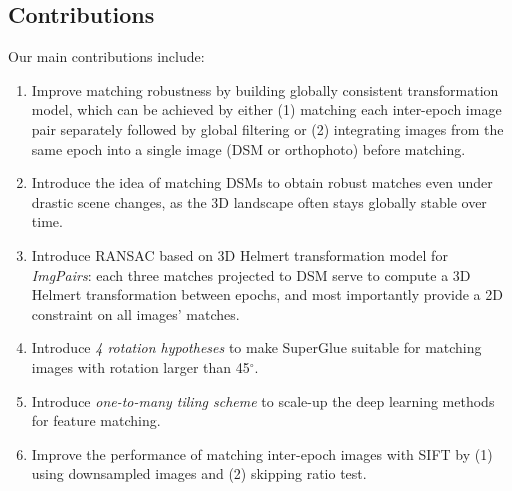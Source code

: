 
\subsection{Contributions}
Our main contributions include:\\
\begin{enumerate}
	\item Improve matching robustness by building globally consistent transformation model, which can be achieved by either (1) matching each inter-epoch image pair separately followed by global filtering or (2) integrating images from the same epoch into a single image (DSM or orthophoto) before matching.
	\item Introduce the idea of matching DSMs to obtain robust matches even under drastic scene changes, as the 3D landscape often stays globally stable over time.
	\item Introduce RANSAC based on 3D Helmert transformation model for \textit{ImgPairs}: each three matches projected to DSM serve to compute a 3D Helmert transformation between epochs, and most importantly provide a 2D constraint on all images’ matches.
	\item Introduce \textit{4 rotation hypotheses} to make SuperGlue suitable for matching images with rotation larger than 45$^\circ$.
	\item Introduce \textit{one-to-many tiling scheme} to scale-up the deep learning methods for feature matching.
	\item Improve the performance of matching inter-epoch images with SIFT by (1) using downsampled images and (2) skipping ratio test.%
\end{enumerate}



